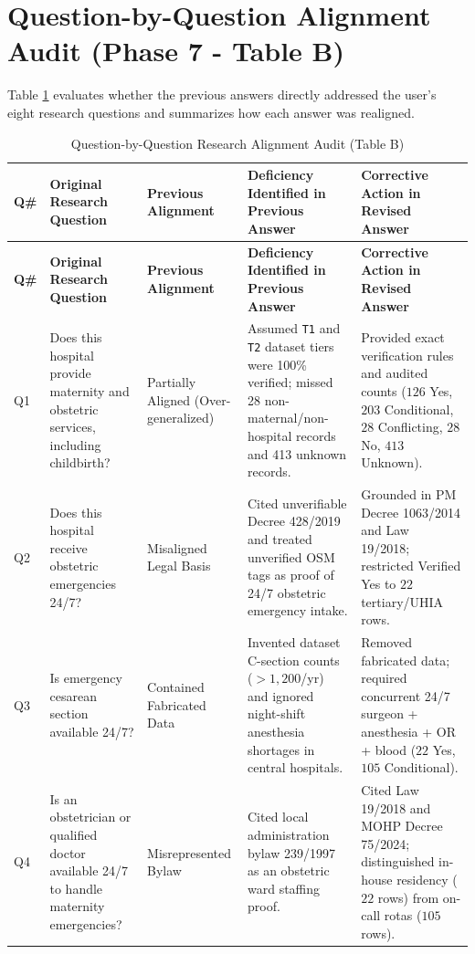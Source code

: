 \documentclass[10pt,a4paper]{article}
\begin{document}
\section{Question-by-Question Alignment Audit (Phase 7 - Table B)}

Table \ref{tab:table_b} evaluates whether the previous answers directly addressed the user's eight research questions and summarizes how each answer was realigned.

{\footnotesize
\begin{longtable}{p{0.8cm} p{3.8cm} p{2.8cm} p{4.8cm} p{3.6cm}}
\caption{Question-by-Question Research Alignment Audit (Table B)} \label{tab:table_b} \\
\toprule
\textbf{Q\#} & \textbf{Original Research Question} & \textbf{Previous Alignment} & \textbf{Deficiency Identified in Previous Answer} & \textbf{Corrective Action in Revised Answer} \\
\midrule
\endfirsthead
\toprule
\textbf{Q\#} & \textbf{Original Research Question} & \textbf{Previous Alignment} & \textbf{Deficiency Identified in Previous Answer} & \textbf{Corrective Action in Revised Answer} \\
\midrule
\endhead
\bottomrule
\endlastfoot
Q1 & Does this hospital provide maternity and obstetric services, including childbirth? & Partially Aligned (Over-generalized) & Assumed \texttt{T1} and \texttt{T2} dataset tiers were 100\% verified; missed 28 non-maternal/non-hospital records and 413 unknown records. & Provided exact verification rules and audited counts ($126$ Yes, $203$ Conditional, $28$ Conflicting, $28$ No, $413$ Unknown). \\[0.3em]
Q2 & Does this hospital receive obstetric emergencies 24/7? & Misaligned Legal Basis & Cited unverifiable Decree 428/2019 and treated unverified OSM tags as proof of 24/7 obstetric emergency intake. & Grounded in PM Decree 1063/2014 and Law 19/2018; restricted Verified Yes to $22$ tertiary/UHIA rows. \\[0.3em]
Q3 & Is emergency cesarean section available 24/7? & Contained Fabricated Data & Invented dataset C-section counts ($>1,200$/yr) and ignored night-shift anesthesia shortages in central hospitals. & Removed fabricated data; required concurrent 24/7 surgeon + anesthesia + OR + blood ($22$ Yes, $105$ Conditional). \\[0.3em]
Q4 & Is an obstetrician or qualified doctor available 24/7 to handle maternity emergencies? & Misrepresented Bylaw & Cited local administration bylaw 239/1997 as an obstetric ward staffing proof. & Cited Law 19/2018 and MOHP Decree 75/2024; distinguished in-house residency ($22$ rows) from on-call rotas ($105$ rows). \\[0.3em]

\end{longtable}}
\end{document}
